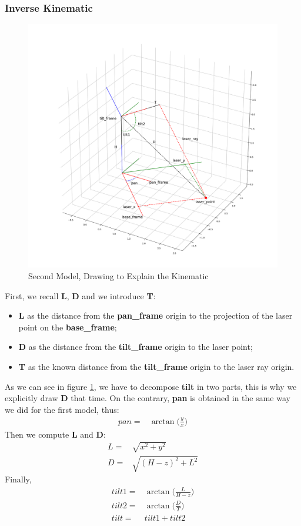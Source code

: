 \subsubsection{Inverse Kinematic}
\begin{figure}
	\centering
	\includegraphics[width=\textwidth]{img/model2XY.png}%
	\caption{Second Model, Drawing to Explain the Kinematic}
	\label{fig:secondModelPanTilt}
\end{figure}
First, we recall \textbf{L}, \textbf{D} and we introduce \textbf{T}:
\begin{itemize}
    \item \textbf{L} as the distance from the \textbf{pan\_frame} origin to the projection of the laser point on the \textbf{base\_frame};
    \item \textbf{D} as the distance from the \textbf{tilt\_frame} origin to the laser point;
    \item \textbf{T} as the known distance from the \textbf{tilt\_frame} origin to the laser ray origin.
\end{itemize}
As we can see in figure \ref{fig:secondModelPanTilt}, we have to decompose \textbf{tilt} in two parts, this is why we explicitly draw \textbf{D} that time. On the contrary, \textbf{pan} is obtained in the same way we did for the first model, thus:
\begin{align}
	pan=& \arctan\bigg(\frac{y}{x}\bigg)\label{eq:panik2}
\end{align}
Then we compute \textbf{L} and \textbf{D}:
\begin{align}
	L=& \sqrt{x^2+y^2}\\
	D=& \sqrt{(H-z)^2 + L^2}
\end{align}
Finally,
\begin{align}
	tilt1 =& \arctan\bigg(\frac{L}{H-z}\bigg)\\
	tilt2 =& \arctan\bigg(\frac{D}{T}\bigg)\\
	tilt =& tilt1 + tilt2
\end{align}
